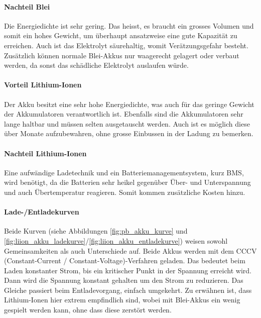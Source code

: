\paragraph{Nachteil Blei}

Die Energiedichte ist sehr gering. Das heisst, es braucht ein grosses Volumen und somit ein hohes Gewicht, um überhaupt ansatzweise eine gute Kapazität zu erreichen. Auch ist das Elektrolyt säurehaltig, womit Verätzungsgefahr besteht. Zusätzlich können normale Blei-Akkus nur waagerecht gelagert oder verbaut werden, da sonst das schädliche Elektrolyt auslaufen würde.

\paragraph{Vorteil Lithium-Ionen}

Der Akku besitzt eine sehr hohe Energiedichte, was auch für das geringe Gewicht der Akkumulatoren verantwortlich ist. Ebenfalls sind die Akkumulatoren sehr lange haltbar und müssen selten ausgetauscht werden. Auch ist es möglich diese über Monate aufzubewahren, ohne grosse Einbussen in der Ladung zu bemerken.

\paragraph{Nachteil Lithium-Ionen}

Eine aufwändige Ladetechnik und ein Batteriemanagementsystem, kurz BMS, wird benötigt, da die Batterien sehr heikel gegenüber Über- und Unterspannung und auch Übertemperatur reagieren. Somit kommen zusätzliche Kosten hinzu.

\paragraph{Lade-/Entladekurven}

Beide Kurven (siehe Abbildungen \ref{fig:pb_akku_kurve} und \ref{fig:liion_akku_ladekurve}/\ref{fig:liion_akku_entladekurve}) weisen sowohl Gemeinsamkeiten als auch Unterschiede auf. Beide Akkus werden mit dem CCCV (Constant-Current / Constant-Voltage)-Verfahren  geladen. Das bedeutet beim Laden konstanter Strom, bis ein kritischer Punkt in der Spannung erreicht wird. Dann wird die Spannung konstant gehalten um den Strom zu reduzieren. Das Gleiche passiert beim Entladevorgang, einfach umgekehrt. Zu erwähnen ist, dass Lithium-Ionen hier extrem empfindlich sind, wobei mit Blei-Akkus ein wenig gespielt werden kann, ohne dass diese zerstört werden.

